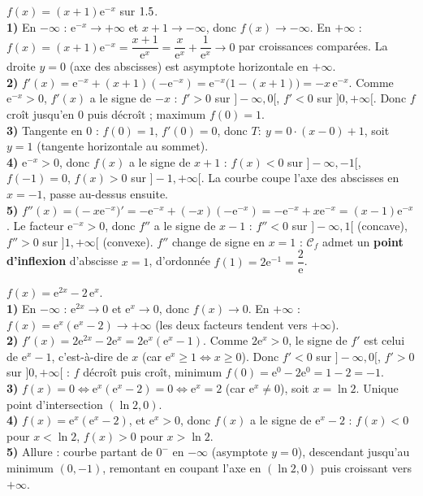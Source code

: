 $f(x)=(x+1)\mathrm{e}^{-x}$ sur $1.5$.\\
\textbf{1)} En $-\infty$ : $\mathrm{e}^{-x}\to+\infty$ et $x+1\to-\infty$, donc $f(x)\to-\infty$.
En $+\infty$ : $f(x)=(x+1)\mathrm{e}^{-x}=\dfrac{x+1}{\mathrm{e}^{x}}=\dfrac{x}{\mathrm{e}^{x}}+\dfrac1{\mathrm{e}^{x}}\to0$
par croissances comparées. La droite $y=0$ (axe des abscisses) est asymptote horizontale en
$+\infty$.\\
\textbf{2)} $f'(x)=\mathrm{e}^{-x}+(x+1)(-\mathrm{e}^{-x})=\mathrm{e}^{-x}\big(1-(x+1)\big)=-x\,\mathrm{e}^{-x}$.
Comme $\mathrm{e}^{-x}>0$, $f'(x)$ a le signe de $-x$ : $f'>0$ sur $]-\infty,0[$, $f'<0$ sur
$]0,+\infty[$. Donc $f$ croît jusqu'en $0$ puis décroît ; maximum $f(0)=1$.\\
\textbf{3)} Tangente en $0$ : $f(0)=1$, $f'(0)=0$, donc $T:\ y=0\cdot(x-0)+1$, soit $y=1$
(tangente horizontale au sommet).\\
\textbf{4)} $\mathrm{e}^{-x}>0$, donc $f(x)$ a le signe de $x+1$ : $f(x)<0$ sur $]-\infty,-1[$,
$f(-1)=0$, $f(x)>0$ sur $]-1,+\infty[$. La courbe coupe l'axe des abscisses en $x=-1$, passe
au-dessus ensuite.\\
\textbf{5)} $f''(x)=\big(-x\mathrm{e}^{-x}\big)'=-\mathrm{e}^{-x}+(-x)(-\mathrm{e}^{-x})
=-\mathrm{e}^{-x}+x\mathrm{e}^{-x}=(x-1)\mathrm{e}^{-x}$.
Le facteur $\mathrm{e}^{-x}>0$, donc $f''$ a le signe de $x-1$ : $f''<0$ sur $]-\infty,1[$
(concave), $f''>0$ sur $]1,+\infty[$ (convexe). $f''$ change de signe en $x=1$ :
$\mathcal C_f$ admet un \textbf{point d'inflexion} d'abscisse $x=1$, d'ordonnée
$f(1)=2\mathrm{e}^{-1}=\dfrac2{\mathrm{e}}$.

$f(x)=\mathrm{e}^{2x}-2\,\mathrm{e}^{x}$.\\
\textbf{1)} En $-\infty$ : $\mathrm{e}^{2x}\to0$ et $\mathrm{e}^{x}\to0$, donc $f(x)\to0$.
En $+\infty$ : $f(x)=\mathrm{e}^{x}(\mathrm{e}^{x}-2)\to+\infty$ (les deux facteurs tendent vers
$+\infty$).\\
\textbf{2)} $f'(x)=2\mathrm{e}^{2x}-2\mathrm{e}^{x}=2\mathrm{e}^{x}(\mathrm{e}^{x}-1)$. Comme
$2\mathrm{e}^{x}>0$, le signe de $f'$ est celui de $\mathrm{e}^{x}-1$, c'est-à-dire de $x$
(car $\mathrm{e}^{x}\ge1\iff x\ge0$). Donc $f'<0$ sur $]-\infty,0[$, $f'>0$ sur $]0,+\infty[$ :
$f$ décroît puis croît, minimum $f(0)=\mathrm{e}^{0}-2\mathrm{e}^{0}=1-2=-1$.\\
\textbf{3)} $f(x)=0\iff\mathrm{e}^{x}(\mathrm{e}^{x}-2)=0\iff\mathrm{e}^{x}=2$ (car $\mathrm{e}^{x}\ne0$),
soit $x=\ln2$. Unique point d'intersection $(\ln2,0)$.\\
\textbf{4)} $f(x)=\mathrm{e}^{x}(\mathrm{e}^{x}-2)$, et $\mathrm{e}^{x}>0$, donc $f(x)$ a le signe de
$\mathrm{e}^{x}-2$ : $f(x)<0$ pour $x<\ln2$, $f(x)>0$ pour $x>\ln2$.\\
\textbf{5)} Allure : courbe partant de $0^{-}$ en $-\infty$ (asymptote $y=0$), descendant jusqu'au
minimum $(0,-1)$, remontant en coupant l'axe en $(\ln2,0)$ puis croissant vers $+\infty$.

